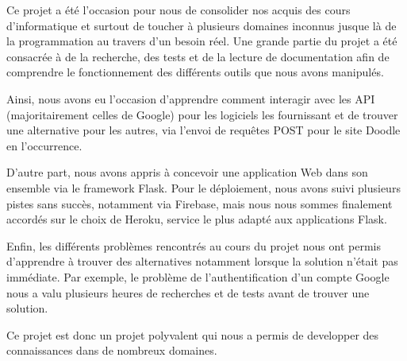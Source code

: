 Ce projet a été l'occasion pour nous de consolider nos acquis des cours d'informatique et surtout de toucher à plusieurs domaines inconnus jusque là de la programmation au travers d'un besoin réel. Une grande partie du projet a été consacrée à de la recherche, des tests et de la lecture de documentation afin de comprendre le fonctionnement des différents outils que nous avons manipulés. 

Ainsi, nous avons eu l'occasion d'apprendre comment interagir avec les API (majoritairement celles de Google) pour les logiciels les fournissant et de trouver une alternative pour les autres, via l'envoi de requêtes POST pour le site Doodle en l'occurrence. 

D'autre part, nous avons appris à concevoir une application Web dans son ensemble via le framework Flask. Pour le déploiement, nous avons suivi plusieurs pistes sans succès, notamment via Firebase, mais nous nous sommes finalement accordés sur le choix de Heroku, service le plus adapté aux applications Flask. 

Enfin, les différents problèmes rencontrés au cours du projet nous ont permis d'apprendre à trouver des alternatives notamment lorsque la solution n'était pas immédiate. Par exemple, le problème de l'authentification d'un compte Google nous a valu plusieurs heures de recherches et de tests avant de trouver une solution. 

Ce projet est donc un projet polyvalent qui nous a permis de developper des connaissances dans de nombreux domaines. 